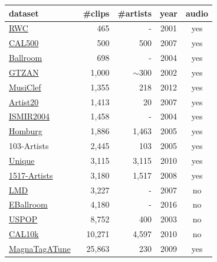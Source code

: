 \documentclass{article}
\begin{document}
\begin{table}[t]
	\small
	\centering
	\begin{threeparttable}
	\begin{tabular}{l@{ }rrcc}
		\toprule
		dataset\tnote{1} & \#clips & \#artists & year & audio \\
		\midrule
		\href{https://staff.aist.go.jp/m.goto/RWC-MDB/}{RWC}~\cite{RWC} & 465 & - & 2001 & yes \\
		\href{http://calab1.ucsd.edu/~datasets/cal500/}{CAL500}~\cite{cal500} & 500 & 500 & 2007 & yes \\
		\href{http://mtg.upf.edu/ismir2004/contest/tempoContest/node5.html}{Ballroom}~\cite{ballroom} & 698 & - & 2004 & yes \\
		\href{https://marsyasweb.appspot.com/download/data_sets/}{GTZAN}~\cite{gtzan} & 1,000 & $\sim300$ & 2002 & yes \\
		\href{http://www.cp.jku.at/datasets/musiclef/}{MusiClef}~\cite{musiclef} & 1,355 & 218 & 2012 & yes \\
		\href{https://labrosa.ee.columbia.edu/projects/artistid/}{Artist20}~\cite{artist20} & 1,413 & 20 & 2007 & yes \\
		\href{http://ismir2004.ismir.net/genre_contest/}{ISMIR2004} & 1,458 & - & 2004 & yes \\
		\href{http://www-ai.cs.uni-dortmund.de/audio.html}{Homburg}~\cite{homburg} & 1,886 & 1,463 & 2005 & yes \\  %
		103-Artists~\cite{103artists} & 2,445 & 103 & 2005 & yes \\
		\href{http://www.seyerlehner.info/index.php?p=1_3_Download}{Unique}~\cite{unique} & 3,115 & 3,115 & 2010 & yes \\
		\href{http://www.seyerlehner.info/index.php?p=1_3_Download}{1517-Artists}~\cite{1517artists} & 3,180 & 1,517 & 2008 & yes \\
		\href{http://www.ppgia.pucpr.br/~silla/lmd/}{LMD}~\cite{lmd} & 3,227 & - & 2007 & no \\
		\href{http://anasynth.ircam.fr/home/media/ExtendedBallroom}{EBallroom}~\cite{extballroom} & 4,180 & - & 2016 & no\tnote{2} \\
		\href{https://labrosa.ee.columbia.edu/projects/musicsim/uspop2002.html}{USPOP}~\cite{uspop} & 8,752 & 400 & 2003 & no \\
		\href{http://calab1.ucsd.edu/~datasets/cal10k/}{CAL10k}~\cite{cal10k} & 10,271 & 4,597 & 2010 & no \\ %
		\href{http://mirg.city.ac.uk/codeapps/the-magnatagatune-dataset}{MagnaTagATune}~\cite{magnatagatune} & 25,863\tnote{3} & 230 & 2009 & yes\tnote{4} \\ %

\end{tabular}
\end{threeparttable}
\end{table}
\end{document}

